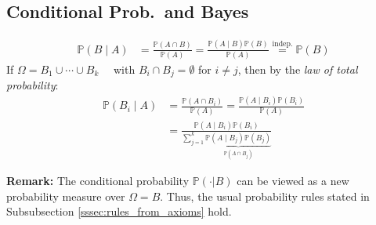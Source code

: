 \subsection{Conditional Prob.\ and Bayes}
\noindent\begin{align*}
    \mathbb{P}(B\mid A) & =\frac{\mathbb{P}(A\cap B)}{\mathbb{P}(A)}=\frac{\mathbb{P}(A\mid B)\mathbb{P}(B)}{\mathbb{P}(A)} \overset{\text{indep.}}{=} \mathbb{P}(B)
\end{align*}
If $\Omega=B_1\cup\cdots\cup B_k\quad$ with $B_i\cap B_j=\emptyset$ for $i\neq j$, then by the \textit{law of total probability}:
\noindent\begin{align*}
    \mathbb{P}(B_i\mid A) & =\frac{\mathbb{P}(A\cap B_i)}{\mathbb{P}(A)}=\frac{\mathbb{P}(A\mid B_i)\mathbb{P}(B_i)}{\mathbb{P}(A)}                              \\
                          & =\frac{\mathbb{P}(A\mid B_i)\mathbb{P}(B_i)}{\sum_{j=1}^k \underbrace{\mathbb{P}(A\mid B_j)\mathbb{P}(B_j)}_{\mathbb{P}(A\cap B_j)}}
\end{align*}

\textbf{Remark:} The conditional probability $\mathbb{P}(\cdot|B)$ can be viewed as a new probability measure over $\Omega=B$. Thus, the usual probability rules stated in Subsubsection \ref{sssec:rules_from_axioms} hold.